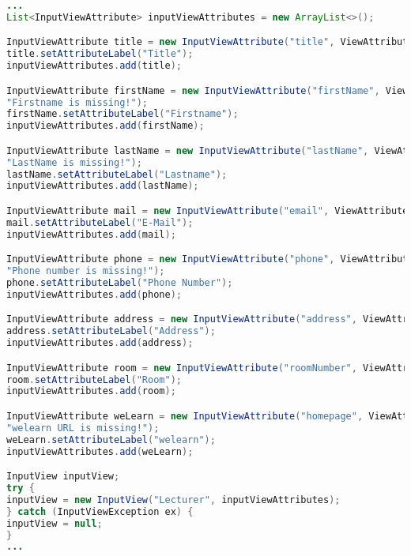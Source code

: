 \newpage

\begin{lstlisting}[label=lst:inputview_impl,
language=java,
firstnumber=1,
caption=Erstellung einer InputView.]				   
...
List<InputViewAttribute> inputViewAttributes = new ArrayList<>();

InputViewAttribute title = new InputViewAttribute("title", ViewAttribute.AttributeType.TEXT, "Title", "Title is missing!");
title.setAttributeLabel("Title");
inputViewAttributes.add(title);

InputViewAttribute firstName = new InputViewAttribute("firstName", ViewAttribute.AttributeType.TEXT, "FirstName",
"Firstname is missing!");
firstName.setAttributeLabel("Firstname");
inputViewAttributes.add(firstName);

InputViewAttribute lastName = new InputViewAttribute("lastName", ViewAttribute.AttributeType.TEXT, "Lastname",
"LastName is missing!");
lastName.setAttributeLabel("Lastname");
inputViewAttributes.add(lastName);

InputViewAttribute mail = new InputViewAttribute("email", ViewAttribute.AttributeType.MAIL, "E-Mail", "E-Mail is missing!");
mail.setAttributeLabel("E-Mail");
inputViewAttributes.add(mail);

InputViewAttribute phone = new InputViewAttribute("phone", ViewAttribute.AttributeType.PHONE_NUMBER, "Phone Number",
"Phone number is missing!");
phone.setAttributeLabel("Phone Number");
inputViewAttributes.add(phone);

InputViewAttribute address = new InputViewAttribute("address", ViewAttribute.AttributeType.TEXT, "Address", "Address is missing!");
address.setAttributeLabel("Address");
inputViewAttributes.add(address);

InputViewAttribute room = new InputViewAttribute("roomNumber", ViewAttribute.AttributeType.TEXT, "Room", "Room is missing!");
room.setAttributeLabel("Room");
inputViewAttributes.add(room);

InputViewAttribute weLearn = new InputViewAttribute("homepage", ViewAttribute.AttributeType.URL, "welearn",
"welearn URL is missing!");
weLearn.setAttributeLabel("welearn");
inputViewAttributes.add(weLearn);

InputView inputView;
try {
inputView = new InputView("Lecturer", inputViewAttributes);
} catch (InputViewException ex) {
inputView = null;
}
...
\end{lstlisting}